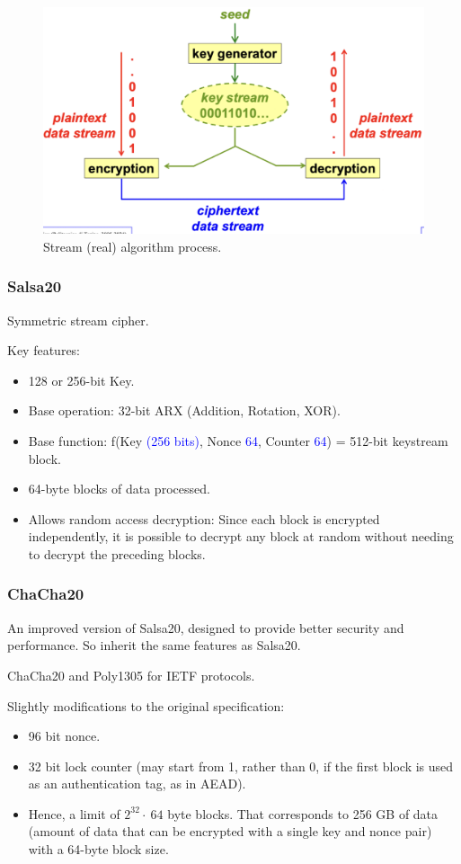 \begin{figure}[H]
    \centering
    \includegraphics[width=0.5\linewidth]{Images/Cryptography/Stream_Cipher.png}
    \caption{Stream (real) algorithm process.}
\end{figure}

\subsubsection{Salsa20}
\begin{center}
Symmetric stream cipher.
\end{center}

Key features:
\begin{itemize}
    \item 128 or 256-bit Key.
    \item Base operation: 32-bit ARX (Addition, Rotation, XOR).
    \item Base function: f(Key \textcolor{Blue}{(256 bits)}, Nonce\textcolor{Blue}{ 64}, Counter\textcolor{Blue}{ 64}) = 512-bit keystream block.
    \item 64-byte blocks of data processed.
    \item Allows random access decryption: Since each block is encrypted independently, it is possible to decrypt any block at random without needing to decrypt the preceding blocks.
\end{itemize}
\subsubsection{ChaCha20}
An improved version of Salsa20, designed to provide better security and performance. So inherit the same features as Salsa20.
\begin{center}
    ChaCha20 and Poly1305 for IETF protocols.
\end{center}
Slightly modifications to the original specification:
\begin{itemize}
    \item 96 bit nonce.
    \item 32 bit lock counter (may start from 1, rather than 0, if the first block is used as an authentication tag, as in AEAD).
    \item Hence, a limit of $2^{32} \cdot \ 64$ byte blocks. That corresponds to 256 GB of data (amount of data that can be encrypted with a single key and nonce pair) with a 64-byte block size.
\end{itemize}

